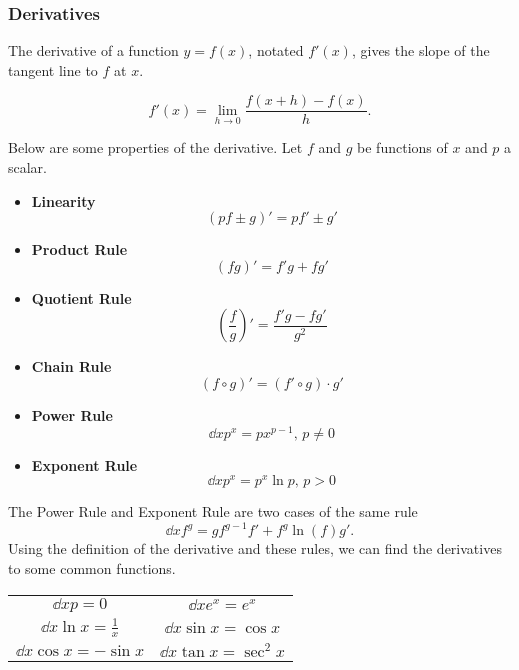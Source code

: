 \subsubsection{Derivatives}
The derivative of a function $y = f(x)$, notated $f'(x)$, gives the slope of the tangent line to $f$ at $x$.
\begin{definition}
	\begin{equation*}
		f'(x) = \lim\limits_{h \to 0}{\frac{f(x+h) - f(x)}{h}}.
	\end{equation*}
\end{definition}

\noindent
Below are some properties of the derivative. Let $f$ and $g$ be functions of $x$ and $p$ a scalar.
\begin{itemize}
	\item \textbf{Linearity}
	\begin{equation*}
		\left( pf \pm g \right)' = pf' \pm g'
	\end{equation*}
	\item \textbf{Product Rule}
	\begin{equation*}
		\left( fg \right)' = f'g + fg'
	\end{equation*}
	\item \textbf{Quotient Rule}
	\begin{equation*}
		\left( \frac{f}{g} \right)' = \frac{f'g - fg'}{g^2}
	\end{equation*}
	\item \textbf{Chain Rule}
	\begin{equation*}
		\left( f \circ g \right)' = \left( f' \circ g \right) \cdot g'
	\end{equation*}
	\item \textbf{Power Rule}
	\begin{equation*}
		\dd{}{x} p^x = px^{p-1} \text{, } p \neq 0
	\end{equation*}
	\item \textbf{Exponent Rule}
	\begin{equation*}
		\dd{}{x} p^x = p^x \ln{p} \text{, } p > 0
	\end{equation*}
\end{itemize}
The Power Rule and Exponent Rule are two cases of the same rule
\begin{equation*}
	\dd{}{x} f^g = gf^{g-1}f' + f^g\ln{(f)}g'.
\end{equation*}
Using the definition of the derivative and these rules, we can find the derivatives to some common functions.
\begin{center}
	\begin{tabular}{c | c}
		\large{$\dd{}{x} p = 0$} 				& \large{$\dd{}{x} e^x = e^x$} 			\\ [0.75em]
		\large{$\dd{}{x} \ln{x} = \frac{1}{x}$} & \large{$\dd{}{x} \sin{x} = \cos{x}$} 	\\ [0.75em]
		\large{$\dd{}{x} \cos{x} = -\sin{x}$} 	& \large{$\dd{}{x} \tan{x} = \sec^2{x}$}
	\end{tabular}
\end{center}

